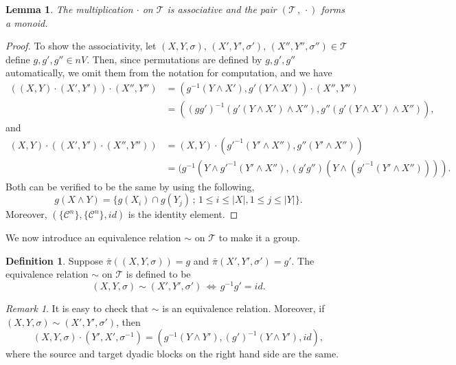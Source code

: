 \documentclass[12pt,reqno]{amsart}
\theoremstyle{plain}
\newtheorem{lemma}[theorem]{Lemma}
\theoremstyle{definition}
\newtheorem{definition}{Definition}[section]
\theoremstyle{remark}
\newtheorem{remark}{Remark}[section]
\numberwithin{equation}{section}
\begin{document}
\begin{lemma}\label{associativity} 
	The multiplication  $\cdot$  on  $\mathcal{T}$  is associative and 
	the pair  $(\mathcal{T} \, , \, \cdot)$  forms a 
	monoid.  
\end{lemma} 
\begin{proof} 
	To show the associativity, 
	let  $(X, Y, \sigma), \, (X', Y', \sigma'), \, (X'', Y'', \sigma'') \in \mathcal{T}$ 
	define  $g, g', g'' \in nV$.  
	Then, 
	since permutations are defined by  $g, g', g''$  automatically, 
	we omit them from the notation for computation, 
	and we have 
	\begin{align*} 
		((X, Y) \cdot (X', Y')) \cdot (X'', Y'') 
		& = (g^{-1}(Y \wedge X'), g'(Y \wedge X')) \cdot (X'', Y'') \\
		& = ((gg')^{-1} (g'(Y \wedge X') \wedge X''), g''(g'(Y \wedge X') \wedge X'')),   
	\end{align*} 
	and 
	\begin{align*} 
		(X, Y) \cdot ((X', Y') \cdot (X'', Y'')) 
		& = (X, Y) \cdot (g'^{-1}(Y' \wedge X''), g''(Y' \wedge X'')) \\
		& = (g^{-1} (Y \wedge g'^{-1}(Y' \wedge X''), (g' g'')(Y \wedge (g'^{-1}(Y' \wedge X'')))). 
	\end{align*} 
	Both can be verified to be the same by using the following,
	\begin{equation*} 
		g(X \wedge Y) = \{ g(X_i) \cap g(Y_j) \, ; \, 1 \leq i \leq |X|,  1 \leq j \leq |Y| \}.     
	\end{equation*}  
	Moreover,
	$(\{ \mathcal{C}^n \}, \{ \mathcal{C}^n \}, id)$  is the identity element.   
\end{proof} 

We now introduce an equivalence relation  $\sim$  on  $\mathcal{T}$  to 
make it a group. 
 

\begin{definition} 
	Suppose  $\bar{\pi}((X, Y, \sigma)) = g$  and  $\bar{\pi} (X', Y', \sigma') = g'$.  
	The equivalence relation  $\sim$  on  $\mathcal{T}$  is defined to be 
	\begin{equation*} 
		(X, Y, \sigma) \sim (X', Y', \sigma') 
		\, \Longleftrightarrow \,  
		g^{-1} g' = id.  
	\end{equation*} 
\end{definition} 

\begin{remark} 
	It is easy to check that  $\sim$  is an equivalence relation.  
	Moreover, 
	if  $(X, Y, \sigma) \sim (X', Y', \sigma')$, 
	then  
	\begin{equation*} 
		(X, Y, \sigma) \cdot (Y', X', \sigma^{-1}) 
		= (g^{-1}(Y \wedge Y'), (g')^{-1}(Y \wedge Y'), id),   
	\end{equation*} 
	where the source and target dyadic blocks on the right hand side are 
	the same.  
\end{remark} 
\end{document}

